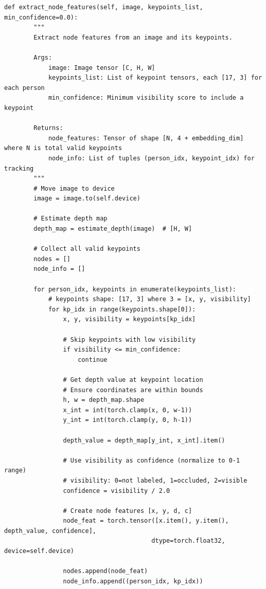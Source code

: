 \begin{lstlisting}[style=pythonstyle,title={Preprocessing May},label={code:preprocessing_may}]
    def extract_node_features(self, image, keypoints_list, min_confidence=0.0):
        """
        Extract node features from an image and its keypoints.
        
        Args:
            image: Image tensor [C, H, W]
            keypoints_list: List of keypoint tensors, each [17, 3] for each person
            min_confidence: Minimum visibility score to include a keypoint
            
        Returns:
            node_features: Tensor of shape [N, 4 + embedding_dim] where N is total valid keypoints
            node_info: List of tuples (person_idx, keypoint_idx) for tracking
        """
        # Move image to device
        image = image.to(self.device)
        
        # Estimate depth map
        depth_map = estimate_depth(image)  # [H, W]
        
        # Collect all valid keypoints
        nodes = []
        node_info = []
        
        for person_idx, keypoints in enumerate(keypoints_list):
            # keypoints shape: [17, 3] where 3 = [x, y, visibility]
            for kp_idx in range(keypoints.shape[0]):
                x, y, visibility = keypoints[kp_idx]
                
                # Skip keypoints with low visibility
                if visibility <= min_confidence:
                    continue
                
                # Get depth value at keypoint location
                # Ensure coordinates are within bounds
                h, w = depth_map.shape
                x_int = int(torch.clamp(x, 0, w-1))
                y_int = int(torch.clamp(y, 0, h-1))
                
                depth_value = depth_map[y_int, x_int].item()
                
                # Use visibility as confidence (normalize to 0-1 range)
                # visibility: 0=not labeled, 1=occluded, 2=visible
                confidence = visibility / 2.0
                
                # Create node features [x, y, d, c]
                node_feat = torch.tensor([x.item(), y.item(), depth_value, confidence], 
                                        dtype=torch.float32, device=self.device)
                
                nodes.append(node_feat)
                node_info.append((person_idx, kp_idx))
        

\end{lstlisting}
